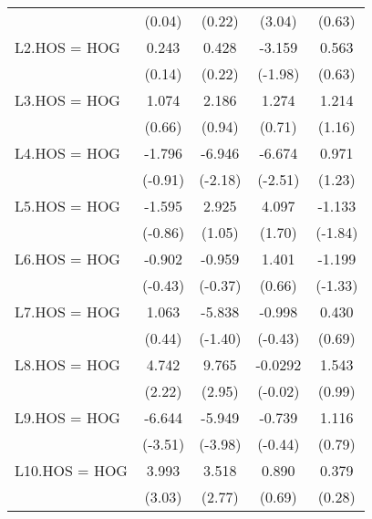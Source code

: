 {\begin{longtable}{l*{4}{c}}
                &   (0.04)         &   (0.22)         &   (3.04)         &   (0.63)         \\
[1em]
L2.HOS = HOG    &    0.243         &    0.428         &   -3.159\sym{*}  &    0.563         \\
                &   (0.14)         &   (0.22)         &  (-1.98)         &   (0.63)         \\
[1em]
L3.HOS = HOG    &    1.074         &    2.186         &    1.274         &    1.214         \\
                &   (0.66)         &   (0.94)         &   (0.71)         &   (1.16)         \\
[1em]
L4.HOS = HOG    &   -1.796         &   -6.946\sym{*}  &   -6.674\sym{*}  &    0.971         \\
                &  (-0.91)         &  (-2.18)         &  (-2.51)         &   (1.23)         \\
[1em]
L5.HOS = HOG    &   -1.595         &    2.925         &    4.097         &   -1.133         \\
                &  (-0.86)         &   (1.05)         &   (1.70)         &  (-1.84)         \\
[1em]
L6.HOS = HOG    &   -0.902         &   -0.959         &    1.401         &   -1.199         \\
                &  (-0.43)         &  (-0.37)         &   (0.66)         &  (-1.33)         \\
[1em]
L7.HOS = HOG    &    1.063         &   -5.838         &   -0.998         &    0.430         \\
                &   (0.44)         &  (-1.40)         &  (-0.43)         &   (0.69)         \\
[1em]
L8.HOS = HOG    &    4.742\sym{*}  &    9.765\sym{**} &  -0.0292         &    1.543         \\
                &   (2.22)         &   (2.95)         &  (-0.02)         &   (0.99)         \\
[1em]
L9.HOS = HOG    &   -6.644\sym{***}&   -5.949\sym{***}&   -0.739         &    1.116         \\
                &  (-3.51)         &  (-3.98)         &  (-0.44)         &   (0.79)         \\
[1em]
L10.HOS = HOG   &    3.993\sym{**} &    3.518\sym{**} &    0.890         &    0.379         \\
                &   (3.03)         &   (2.77)         &   (0.69)         &   (0.28)         \\

\end{longtable}}
